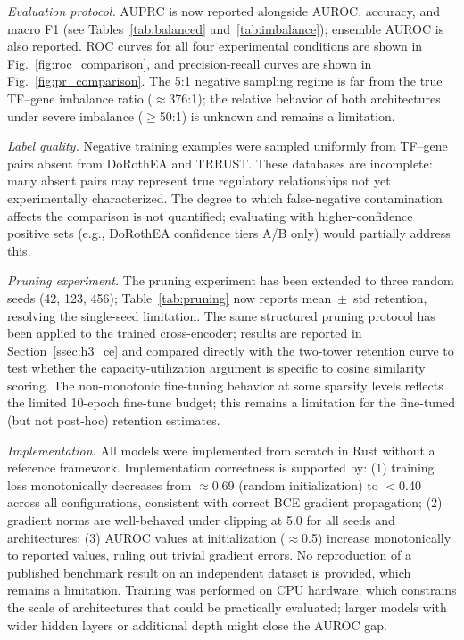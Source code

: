 \documentclass[journal]{IEEEtran}
\begin{document}
\emph{Evaluation protocol.}
AUPRC is now reported alongside AUROC, accuracy, and macro F1 (see
Tables~\ref{tab:balanced} and~\ref{tab:imbalance}); ensemble AUROC is also
reported. ROC curves for all four experimental conditions are shown in
Fig.~\ref{fig:roc_comparison}, and precision-recall curves are shown in
Fig.~\ref{fig:pr_comparison}. The 5:1 negative sampling regime is far from the
true TF--gene imbalance ratio ($\approx$376:1); the relative behavior of both
architectures under severe imbalance ($\geq$50:1) is unknown and remains a
limitation.

\emph{Label quality.}
Negative training examples were sampled uniformly from TF--gene pairs absent
from DoRothEA and TRRUST. These databases are incomplete: many absent pairs
may represent true regulatory relationships not yet experimentally
characterized. The degree to which false-negative contamination affects the
comparison is not quantified; evaluating with higher-confidence positive sets
(e.g., DoRothEA confidence tiers A/B only) would partially address this.

\emph{Pruning experiment.}
The pruning experiment has been extended to three random seeds (42, 123, 456);
Table~\ref{tab:pruning} now reports mean~$\pm$~std retention, resolving the
single-seed limitation. The same structured pruning protocol has been applied
to the trained cross-encoder; results are reported in
Section~\ref{ssec:h3_ce} and compared directly with the two-tower retention
curve to test whether the capacity-utilization argument is specific to cosine
similarity scoring. The non-monotonic fine-tuning behavior at some sparsity
levels reflects the limited 10-epoch fine-tune budget; this remains a
limitation for the fine-tuned (but not post-hoc) retention estimates.

\emph{Implementation.}
All models were implemented from scratch in Rust without a reference
framework. Implementation correctness is supported by: (1) training loss
monotonically decreases from $\approx$0.69 (random initialization) to
$<$0.40 across all configurations, consistent with correct BCE gradient
propagation; (2) gradient norms are well-behaved under clipping at 5.0 for
all seeds and architectures; (3) AUROC values at initialization ($\approx$0.5)
increase monotonically to reported values, ruling out trivial gradient errors.
No reproduction of a published benchmark result on an independent dataset is
provided, which remains a limitation. Training was performed on CPU hardware,
which constrains the scale of architectures that could be practically evaluated;
larger models with wider hidden layers or additional depth might close the AUROC
gap.
\end{document}
